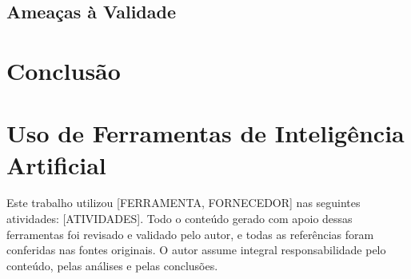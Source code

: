 \documentclass[12pt]{article}
\begin{document}
\subsection{Ameaças à Validade}

\section{Conclusão}\label{sec:conclusao}

\section*{Uso de Ferramentas de Inteligência Artificial}
Este trabalho utilizou [FERRAMENTA, FORNECEDOR] nas seguintes atividades:
[ATIVIDADES]. Todo o conteúdo gerado com apoio dessas ferramentas foi revisado
e validado pelo autor, e todas as referências foram conferidas nas fontes
originais. O autor assume integral responsabilidade pelo conteúdo, pelas
análises e pelas conclusões.



\end{document}

